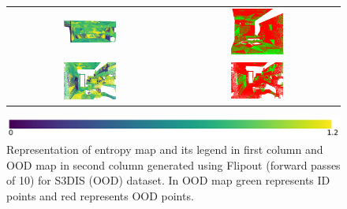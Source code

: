 \begin{figure}[h!]
\begin{tabular}{cc}
            \includegraphics[width=0.33\textwidth, height=0.18\textheight]{images/ood_imgs/fout_s3dis/pnt_1_fout_ent.pdf}& 
            \includegraphics[width=0.33\textwidth, height=0.18\textheight]{images/ood_imgs/fout_s3dis/fout_ent_3.pdf}\\

            \includegraphics[width=0.33\textwidth, height=0.18\textheight]{images/ood_imgs/fout_s3dis/ofc_42_fout_ent.pdf}& 
            \includegraphics[width=0.33\textwidth, height=0.18\textheight]{images/ood_imgs/fout_s3dis/fout_ent_1.pdf}\\
        \end{tabular}
        \includegraphics[scale=0.45]{images/ent_legend.pdf}
        \caption{Representation of entropy map and its legend in first column and OOD map in second column generated using Flipout (forward passes of 10) for S3DIS (OOD) dataset. In OOD map green represents ID points and red represents OOD points.}
        \label{fig:fout_s3dis_oodmap_ent}
    \end{figure}
    \FloatBarrier


